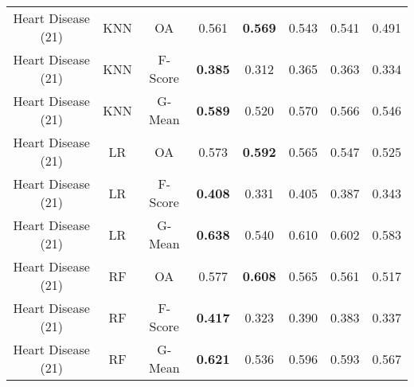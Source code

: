 \begin{longtable}{cccccccc}
Heart Disease (21) &        KNN &      OA &          0.561 & \textbf{0.569} &          0.543 &          0.541 &          0.491 \\
Heart Disease (21) &        KNN & F-Score & \textbf{0.385} &          0.312 &          0.365 &          0.363 &          0.334 \\
Heart Disease (21) &        KNN &  G-Mean & \textbf{0.589} &          0.520 &          0.570 &          0.566 &          0.546 \\
Heart Disease (21) &         LR &      OA &          0.573 & \textbf{0.592} &          0.565 &          0.547 &          0.525 \\
Heart Disease (21) &         LR & F-Score & \textbf{0.408} &          0.331 &          0.405 &          0.387 &          0.343 \\
Heart Disease (21) &         LR &  G-Mean & \textbf{0.638} &          0.540 &          0.610 &          0.602 &          0.583 \\
Heart Disease (21) &         RF &      OA &          0.577 & \textbf{0.608} &          0.565 &          0.561 &          0.517 \\
Heart Disease (21) &         RF & F-Score & \textbf{0.417} &          0.323 &          0.390 &          0.383 &          0.337 \\
Heart Disease (21) &         RF &  G-Mean & \textbf{0.621} &          0.536 &          0.596 &          0.593 &          0.567 \\
\end{longtable}
